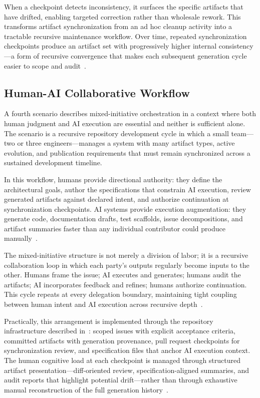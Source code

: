 When a checkpoint detects inconsistency, it surfaces the specific artifacts that have drifted, enabling targeted correction rather than wholesale rework. This transforms artifact synchronization from an ad hoc cleanup activity into a tractable recursive maintenance workflow. Over time, repeated synchronization checkpoints produce an artifact set with progressively higher internal consistency---a form of recursive convergence that makes each subsequent generation cycle easier to scope and audit~\cite{Lamport1978TimeClocks,Chandy1985DistributedSnapshots}.

\subsection{Human-AI Collaborative Workflow}

A fourth scenario describes mixed-initiative orchestration in a context where both human judgment and AI execution are essential and neither is sufficient alone. The scenario is a recursive repository development cycle in which a small team---two or three engineers---manages a system with many artifact types, active evolution, and publication requirements that must remain synchronized across a sustained development timeline.

In this workflow, humans provide directional authority: they define the architectural goals, author the specifications that constrain AI execution, review generated artifacts against declared intent, and authorize continuation at synchronization checkpoints. AI systems provide execution augmentation: they generate code, documentation drafts, test scaffolds, issue decompositions, and artifact summaries faster than any individual contributor could produce manually~\cite{Amershi2014InteractiveML,Chen2021Codex}.

The mixed-initiative structure is not merely a division of labor; it is a recursive collaboration loop in which each party's outputs regularly become inputs to the other. Humans frame the issue; AI executes and generates; humans audit the artifacts; AI incorporates feedback and refines; humans authorize continuation. This cycle repeats at every delegation boundary, maintaining tight coupling between human intent and AI execution across recursive depth~\cite{Shneiderman2020HCAI}.

Practically, this arrangement is implemented through the repository infrastructure described in~: scoped issues with explicit acceptance criteria, committed artifacts with generation provenance, pull request checkpoints for synchronization review, and specification files that anchor AI execution context. The human cognitive load at each checkpoint is managed through structured artifact presentation---diff-oriented review, specification-aligned summaries, and audit reports that highlight potential drift---rather than through exhaustive manual reconstruction of the full generation history~\cite{Sweller1988CognitiveLoad,Hutchins1995CognitionWild}.

